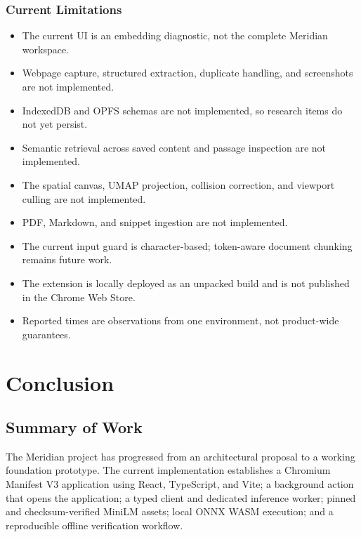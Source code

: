 \documentclass{tietreport}
\begin{document}
\subsection{Current Limitations}

\begin{itemize}
  \item The current UI is an embedding diagnostic, not the complete Meridian workspace.
  \item Webpage capture, structured extraction, duplicate handling, and screenshots are not
    implemented.
  \item IndexedDB and OPFS schemas are not implemented, so research items do not yet persist.
  \item Semantic retrieval across saved content and passage inspection are not implemented.
  \item The spatial canvas, UMAP projection, collision correction, and viewport culling are
    not implemented.
  \item PDF, Markdown, and snippet ingestion are not implemented.
  \item The current input guard is character-based; token-aware document chunking remains
    future work.
  \item The extension is locally deployed as an unpacked build and is not published in the
    Chrome Web Store.
  \item Reported times are observations from one environment, not product-wide guarantees.
\end{itemize}


\chapter{Conclusion}

\section{Summary of Work}

The Meridian project has progressed from an architectural proposal to a working foundation
prototype. The current implementation establishes a Chromium Manifest V3 application using
React, TypeScript, and Vite; a background action that opens the application; a typed client
and dedicated inference worker; pinned and checksum-verified MiniLM assets; local ONNX WASM
execution; and a reproducible offline verification workflow.
\end{document}
